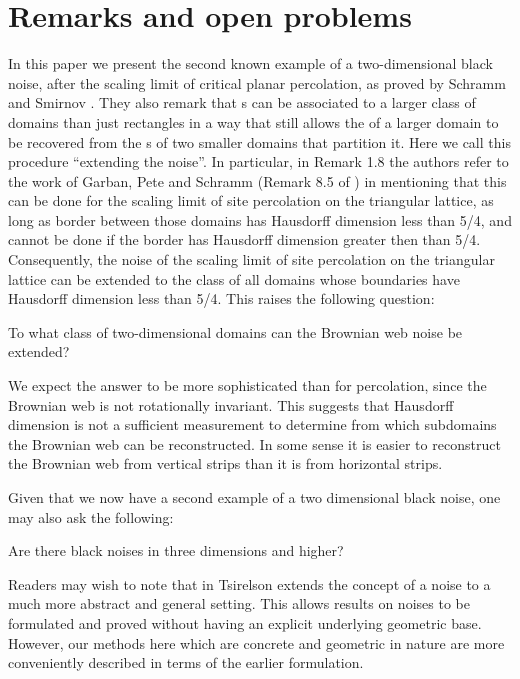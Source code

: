 {
\section{Remarks and open problems}

\label{sec:open-problems}

In this paper we present the second known example of a two-dimensional
black noise, after the scaling limit of critical planar percolation,
as proved by Schramm and Smirnov \cite{schramm-smirnov}.  They also remark
that \sigfield{}s can be associated to a larger class of domains than
just rectangles in a way that still allows the \sigfield{} of a larger
domain to be recovered from the \sigfield{}s of two smaller domains
that partition it.
Here we call this procedure ``extending the noise''.
In particular, in Remark 1.8 the authors refer to the work of Garban,
Pete and Schramm (Remark 8.5 of \cite{garban-pete-schramm}) in
mentioning that this can be done for the
scaling limit of site percolation on the triangular lattice, as long
as border between those domains has Hausdorff dimension less
than 5/4, and cannot be done if the border has Hausdorff dimension
greater then than 5/4.
Consequently, the noise of the scaling limit of site percolation on
the triangular lattice can be extended to the class of all domains
whose boundaries have Hausdorff dimension less than 5/4.
This raises the following question:

\begin{openproblem}
  \label{openproblem:extend}
  To what class of two-dimensional domains can the Brownian web noise be extended?
\end{openproblem}

We expect the answer to be more sophisticated than for percolation,
since the Brownian web is not rotationally invariant.
This suggests that Hausdorff dimension is not a sufficient measurement
to determine from which subdomains the Brownian web can be
reconstructed.  In some sense it is easier to reconstruct the Brownian
web from vertical strips than it is from horizontal strips.

Given that we now have a second example of a two dimensional black
noise, one may also ask the following:

\begin{openproblem}
  Are there black noises in three dimensions and higher?
\end{openproblem}

Readers may wish to note that in
\cite{tsirelson-noise-as-a-boolean-algebra} Tsirelson extends the
concept of a noise to a much more abstract and general setting.  This
allows results on noises to be formulated and proved without having an
explicit underlying geometric base.  However, our methods here which are
concrete and geometric in nature are more conveniently described in terms
of the earlier formulation.
}
